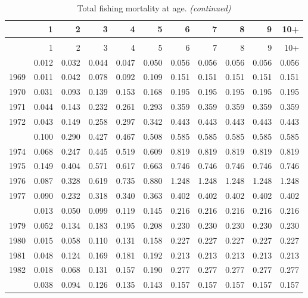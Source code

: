 \documentclass[
]{article}
\begin{document}
\begin{longtable}[t]{lrrrrrrrrrr}
\caption{\label{tab:FAA-tot-table}Total fishing mortality at age.}\\
\toprule
  & 1 & 2 & 3 & 4 & 5 & 6 & 7 & 8 & 9 & 10+\\
\midrule
\endfirsthead
\caption[]{Total fishing mortality at age. \textit{(continued)}}\\
\toprule
  & 1 & 2 & 3 & 4 & 5 & 6 & 7 & 8 & 9 & 10+\\
\midrule
\endhead

\endfoot
\bottomrule
\endlastfoot
1968 & 0.012 & 0.032 & 0.044 & 0.047 & 0.050 & 0.056 & 0.056 & 0.056 & 0.056 & 0.056\\
1969 & 0.011 & 0.042 & 0.078 & 0.092 & 0.109 & 0.151 & 0.151 & 0.151 & 0.151 & 0.151\\
1970 & 0.031 & 0.093 & 0.139 & 0.153 & 0.168 & 0.195 & 0.195 & 0.195 & 0.195 & 0.195\\
1971 & 0.044 & 0.143 & 0.232 & 0.261 & 0.293 & 0.359 & 0.359 & 0.359 & 0.359 & 0.359\\
1972 & 0.043 & 0.149 & 0.258 & 0.297 & 0.342 & 0.443 & 0.443 & 0.443 & 0.443 & 0.443\\
\addlinespace
1973 & 0.100 & 0.290 & 0.427 & 0.467 & 0.508 & 0.585 & 0.585 & 0.585 & 0.585 & 0.585\\
1974 & 0.068 & 0.247 & 0.445 & 0.519 & 0.609 & 0.819 & 0.819 & 0.819 & 0.819 & 0.819\\
1975 & 0.149 & 0.404 & 0.571 & 0.617 & 0.663 & 0.746 & 0.746 & 0.746 & 0.746 & 0.746\\
1976 & 0.087 & 0.328 & 0.619 & 0.735 & 0.880 & 1.248 & 1.248 & 1.248 & 1.248 & 1.248\\
1977 & 0.090 & 0.232 & 0.318 & 0.340 & 0.363 & 0.402 & 0.402 & 0.402 & 0.402 & 0.402\\
\addlinespace
1978 & 0.013 & 0.050 & 0.099 & 0.119 & 0.145 & 0.216 & 0.216 & 0.216 & 0.216 & 0.216\\
1979 & 0.052 & 0.134 & 0.183 & 0.195 & 0.208 & 0.230 & 0.230 & 0.230 & 0.230 & 0.230\\
1980 & 0.015 & 0.058 & 0.110 & 0.131 & 0.158 & 0.227 & 0.227 & 0.227 & 0.227 & 0.227\\
1981 & 0.048 & 0.124 & 0.169 & 0.181 & 0.192 & 0.213 & 0.213 & 0.213 & 0.213 & 0.213\\
1982 & 0.018 & 0.068 & 0.131 & 0.157 & 0.190 & 0.277 & 0.277 & 0.277 & 0.277 & 0.277\\
\addlinespace
1983 & 0.038 & 0.094 & 0.126 & 0.135 & 0.143 & 0.157 & 0.157 & 0.157 & 0.157 & 0.157\\

\end{longtable}
\end{document}
